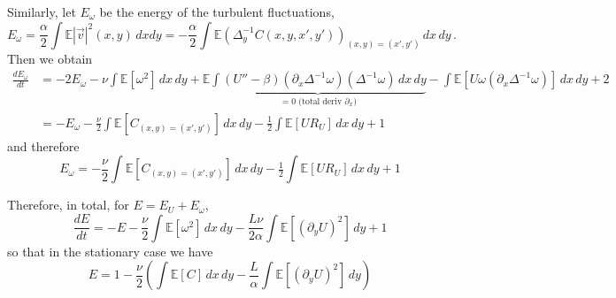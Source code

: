 \documentclass[11pt]{amsart}
\def\EE{\mathbb{E}}\def\PP{\mathbb{P}}
\begin{document}
Similarly, let $E_\omega$ be the energy of the turbulent fluctuations,
\begin{equation}
  E_\omega = \frac\alpha2\int \EE|\vec{v}|^2(x,y)\,dxdy = -\frac\alpha2\int\EE\left(\Delta_y^{-1} C(x,y,x',y')\right)_{(x,y)=(x',y')}\,dx\,dy\,.
\end{equation}
Then we obtain
\begin{align*}
  \frac{dE_\omega}{dt} &= -2E_\omega -\nu\int\EE[\omega^2]\,dx\,dy+\EE\underbrace{\int(U''-\beta)(\partial_x\Delta^{-1}\omega)(\Delta^{-1}\omega)\,dx\,dy}_{=0 \textrm{ (total deriv $\partial_x$)}}-\int\EE[U\omega (\partial_x\Delta^{-1}\omega)]\,dx\,dy+2\\
  &= -E_\omega -\frac\nu2\int\EE[C_{(x,y)=(x',y')}]\,dx\,dy-\tfrac12 \int\EE[U R_U]\,dx\,dy+1
\end{align*}
and therefore
\begin{equation}
  E_\omega= -\frac\nu2\int\EE[C_{(x,y)=(x',y')}]\,dx\,dy-\tfrac12 \int\EE[U R_U]\,dx\,dy+1
\end{equation}

Therefore, in total, for $E=E_U + E_\omega$,
\begin{equation}
  \frac{dE}{dt} = -E -\frac\nu2\int\EE[\omega^2]\,dx\,dy - \frac{L\nu}{2\alpha} \int\EE[(\partial_y U)^2]\,dy + 1
\end{equation}
so that in the stationary case we have
\begin{equation}
  E = 1 - \frac\nu2 \left(\int\EE[C]\,dx\,dy - \frac{L}{\alpha} \int\EE[(\partial_y U)^2]\,dy\right)
\end{equation}


 

\end{document}
